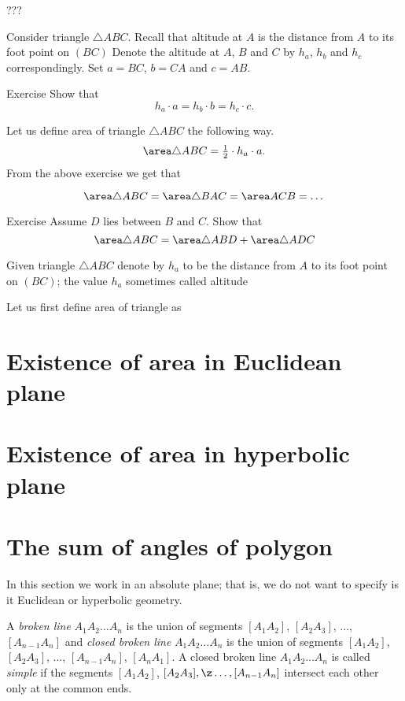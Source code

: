 ???

Consider triangle $\triangle ABC$.
Recall that altitude at $A$ is the distance from $A$ to its foot point on $(BC)$
Denote the altitude at $A$, $B$ and $C$ by $h_a$, $h_b$ and $h_c$ correspondingly.
Set $a=BC$, $b=CA$ and $c=AB$.

\begin{thm}{Exercise}
Show that 
$$h_a\cdot a=h_b\cdot b=h_c\cdot c.$$
\end{thm}


Let us define area of triangle $\triangle ABC$ the following way.
$$\area \triangle ABC= \tfrac12\cdot h_a\cdot a.
$$
From the above exercise we get that 

$$\area \triangle ABC=\area \triangle BAC=\area ACB=\dots$$


\begin{thm}{Exercise}
Assume $D$ lies between $B$ and $C$.
Show that 
$$\area \triangle ABC=\area \triangle ABD+\area \triangle ADC$$
\end{thm}



Given triangle $\triangle ABC$ denote by
$h_a$ to be the distance from $A$ to its foot point on $(BC)$;
the value $h_a$ sometimes called altitude 

Let us first define area of triangle as 


\section*{Existence of area in Euclidean plane}

\section*{Existence of area in hyperbolic plane}




\section*{The sum of angles of polygon} 

In this section we work in an absolute plane;
that is, we do not want to specify is it Euclidean or hyperbolic geometry.

A \emph{broken line} $A_1A_2\dots A_n$
is the union of segments $[A_1A_2]$, $[A_2A_3]$, ..., $[A_{n-1}A_n]$
and  \emph{closed broken line} $A_1A_2\dots A_n$
is the union of segments $[A_1A_2]$, $[A_2A_3]$, ..., $[A_{n-1}A_n]$, $[A_nA_1]$.
A closed broken line  $A_1A_2\dots A_n$ is called \emph{simple} if the segments  $[A_1A_2]$, $[A_2A_3], \z\dots,[A_{n-1}A_n]$ intersect each other only at the common ends.

